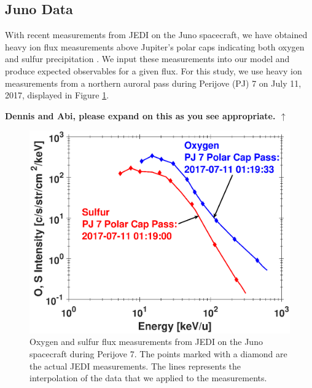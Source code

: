 \documentclass[draft]{agujournal2018}
\begin{document}
\subsection{Juno Data}

With recent measurements from JEDI \citep{mauk2017ssr} on the Juno spacecraft, we have obtained heavy ion flux measurements above Jupiter's polar caps indicating both oxygen and sulfur precipitation \citep{haggerty2017,clark2017a,clark2017b}.
We input these measurements into our model and produce expected observables for a given flux.
For this study, we use heavy ion measurements from a northern auroral pass during Perijove (PJ) 7 on July 11, 2017, displayed in Figure \ref{fig:JEDIFlux}.

\noindent\textbf{\Large Dennis and Abi, please expand on this as you see appropriate. $\uparrow$}

\begin{figure}[ht]
    \centering
    \includegraphics[width=\textwidth]{Figures/O+S_PJ7.eps}
    \caption{Oxygen and sulfur flux measurements from JEDI on the Juno spacecraft during Perijove 7. The points marked with a diamond are the actual JEDI measurements. The lines represents the interpolation of the data that we applied to the measurements.}
    \label{fig:JEDIFlux}
\end{figure}
\end{document}
